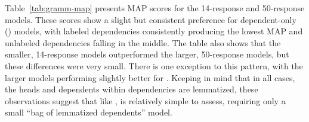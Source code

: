 Table~\ref{tab:gramm-map} presents  MAP scores for the 14-response and 50-response  models. These scores show a slight but consistent preference for dependent-only () models, with labeled dependencies consistently producing the lowest MAP and unlabeled dependencies falling in the middle. The table also shows that the smaller, 14-response models outperformed the larger, 50-response models, but these differences were very small. There is one exception to this pattern, with the larger models performing slightly better for . Keeping in mind that in all cases, the heads and dependents within dependencies are lemmatized, these observations suggest that like ,  is relatively simple to assess, requiring only a small ``bag of lemmatized dependents'' model.


